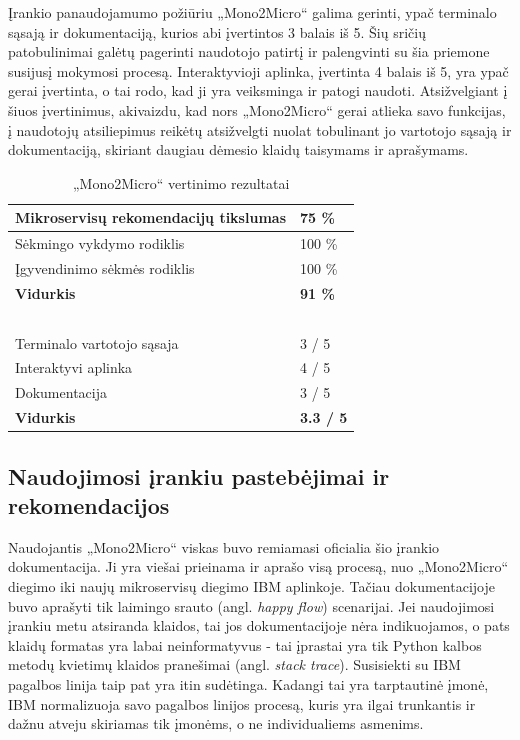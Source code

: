 \documentclass{VUMIFPSbakalaurinis}
\begin{document}
Įrankio panaudojamumo požiūriu „Mono2Micro“ galima gerinti, ypač terminalo sąsają ir dokumentaciją, kurios abi įvertintos 3 balais iš 5. Šių sričių patobulinimai galėtų pagerinti naudotojo patirtį ir palengvinti su šia priemone susijusį mokymosi procesą. Interaktyvioji aplinka, įvertinta 4 balais iš 5, yra ypač gerai įvertinta, o tai rodo, kad ji yra veiksminga ir patogi naudoti. Atsižvelgiant į šiuos įvertinimus, akivaizdu, kad nors „Mono2Micro“ gerai atlieka savo funkcijas, į naudotojų atsiliepimus reikėtų atsižvelgti nuolat tobulinant jo vartotojo sąsają ir dokumentaciją, skiriant daugiau dėmesio klaidų taisymams ir aprašymams.

\begin{table}[!ht]
    \centering
    \caption{„Mono2Micro“ vertinimo rezultatai}
    \label{table:rezultatai}
    \begin{tabular}{|l|l|}
    \hline
        Mikroservisų rekomendacijų tikslumas & 75 \% \\ \hline
        Sėkmingo vykdymo rodiklis & 100 \% \\ \hline
        Įgyvendinimo sėkmės rodiklis & 100 \% \\ \hline
        \textbf{Vidurkis} & \textbf{91 \%} \\ \hline
        ~ & ~ \\ \hline
        Terminalo vartotojo sąsaja & 3 / 5 \\ \hline
        Interaktyvi aplinka & 4 / 5 \\ \hline
        Dokumentacija & 3 / 5 \\ \hline
        \textbf{Vidurkis} & \textbf{3.3 / 5} \\ \hline
    \end{tabular}
\end{table}

\subsection{Naudojimosi įrankiu pastebėjimai ir rekomendacijos} %
Naudojantis „Mono2Micro“ viskas buvo remiamasi oficialia šio įrankio dokumentacija. Ji yra viešai prieinama ir aprašo visą procesą, nuo „Mono2Micro“ diegimo iki naujų mikroservisų diegimo IBM aplinkoje. Tačiau dokumentacijoje buvo aprašyti tik laimingo srauto (angl. \emph{happy flow}) scenarijai. Jei naudojimosi įrankiu metu atsiranda klaidos, tai jos dokumentacijoje nėra indikuojamos, o pats klaidų formatas yra labai neinformatyvus - tai įprastai yra tik Python kalbos metodų kvietimų klaidos pranešimai (angl. \emph{stack trace}). Susisiekti su IBM pagalbos linija taip pat yra itin sudėtinga. Kadangi tai yra tarptautinė įmonė, IBM normalizuoja savo pagalbos linijos procesą, kuris yra ilgai trunkantis ir dažnu atveju skiriamas tik įmonėms, o ne individualiems asmenims.
\end{document}
